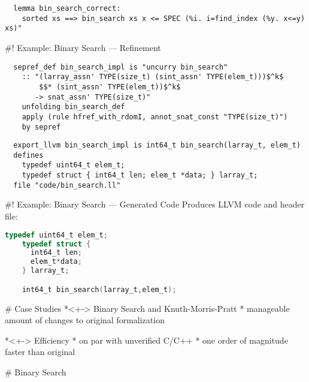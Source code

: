 \documentclass[fleqn]{beamer}
\begin{document}
  \begin{lstlisting}
  lemma bin_search_correct:
    sorted xs ==> bin_search xs x <= SPEC (%i. i=find_index (%y. x<=y) xs)"
  \end{lstlisting}

#! Example: Binary Search --- Refinement

  \begin{lstlisting}
  sepref_def bin_search_impl is "uncurry bin_search"
    :: "(larray_assn' TYPE(size_t) (sint_assn' TYPE(elem_t)))$^k$
        $$* (sint_assn' TYPE(elem_t))$^k$
       -> snat_assn' TYPE(size_t)"
    unfolding bin_search_def
    apply (rule hfref_with_rdomI, annot_snat_const "TYPE(size_t)")
    by sepref
  \end{lstlisting}
  \pause

  \begin{lstlisting}
  export_llvm bin_search_impl is int64_t bin_search(larray_t, elem_t)
  defines
    typedef uint64_t elem_t;
    typedef struct { int64_t len; elem_t *data; } larray_t;
  file "code/bin_search.ll"
  \end{lstlisting}

#! Example: Binary Search --- Generated Code
  Produces LLVM code and header file:
  \begin{lstlisting}[language=C]
    typedef uint64_t elem_t;
    typedef struct {
      int64_t len;
      elem_t*data;
    } larray_t;

    int64_t bin_search(larray_t,elem_t);
  \end{lstlisting}


\renewcommand{\insertsectitle}{{Benchmarks}}


# Case Studies
  *<+-> Binary Search and Knuth-Morris-Pratt
    * manageable amount of changes to original formalization

  *<+-> Efficiency
    * on par with unverified C/C++
    * one order of magnitude faster than original


# Binary Search
\end{document}
